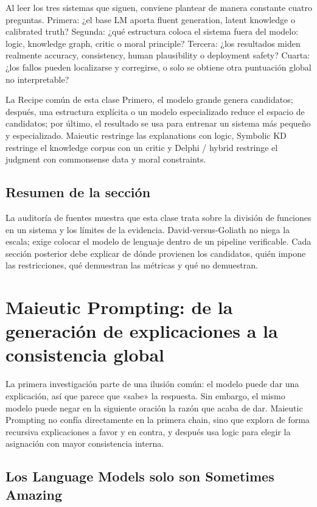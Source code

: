 \documentclass[a4paper]{article}
\begin{document}
Al leer los tres sistemas que siguen, conviene plantear de manera constante cuatro preguntas. Primera: ¿el base LM aporta fluent generation, latent knowledge o calibrated truth? Segunda: ¿qué estructura coloca el sistema fuera del modelo: logic, knowledge graph, critic o moral principle? Tercera: ¿los resultados miden realmente accuracy, consistency, human plausibility o deployment safety? Cuarta: ¿los fallos pueden localizarse y corregirse, o solo se obtiene otra puntuación global no interpretable?

\begin{importantbox}{La Recipe común de esta clase}
Primero, el modelo grande genera candidatos; después, una estructura explícita o un modelo especializado reduce el espacio de candidatos; por último, el resultado se usa para entrenar un sistema más pequeño y especializado. Maieutic restringe las explanations con logic, Symbolic KD restringe el knowledge corpus con un critic y Delphi / hybrid restringe el judgment con commonsense data y moral constraints.
\end{importantbox}

\subsection{Resumen de la sección}

La auditoría de fuentes muestra que esta clase trata sobre la división de funciones en un sistema y los límites de la evidencia. David-versus-Goliath no niega la escala; exige colocar el modelo de lenguaje dentro de un pipeline verificable. Cada sección posterior debe explicar de dónde provienen los candidatos, quién impone las restricciones, qué demuestran las métricas y qué no demuestran.
\section{Maieutic Prompting: de la generación de explicaciones a la consistencia global}

La primera investigación parte de una ilusión común: el modelo puede dar una explicación, así que parece que «sabe» la respuesta. Sin embargo, el mismo modelo puede negar en la siguiente oración la razón que acaba de dar. Maieutic Prompting no confía directamente en la primera chain, sino que explora de forma recursiva explicaciones a favor y en contra, y después usa logic para elegir la asignación con mayor consistencia interna.

\subsection{Los Language Models solo son Sometimes Amazing}
\end{document}
